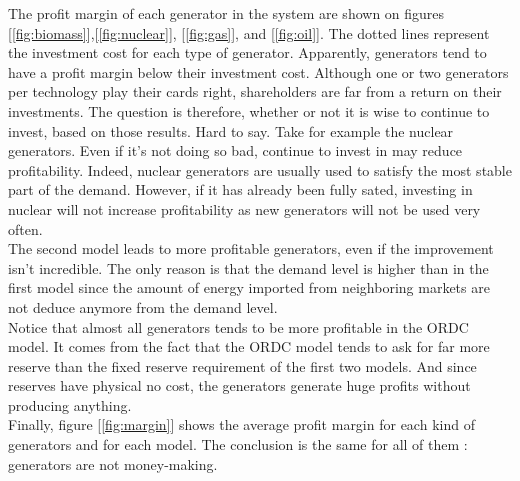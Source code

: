 
The profit margin of each generator in the system are shown on figures [\ref{fig:biomass}],[\ref{fig:nuclear}], [\ref{fig:gas}], and [\ref{fig:oil}]. The dotted lines represent the investment cost for each type of generator. Apparently, generators tend to have a profit margin below their investment cost. Although one or two generators per technology play their cards right, shareholders are far from a return on their investments. The question is therefore, whether or not it is wise to continue to invest, based on those results. Hard to say. Take for example the nuclear generators. Even if it's not doing so bad, continue to invest in may reduce profitability. Indeed, nuclear generators are usually used to satisfy the most stable part of the demand. However, if it has already been fully sated, investing in nuclear will not increase profitability as new generators will not be used very often.\\

The second model leads to more profitable generators, even if the improvement isn't incredible. The only reason is that the demand level is higher than in the first model since the amount of energy imported from neighboring markets are not deduce anymore from the demand level.\\

Notice that almost all generators tends to be more profitable in the ORDC model. It comes from the fact that the ORDC model tends to ask for far more reserve than the fixed reserve requirement of the first two models. And since reserves have physical no cost, the generators generate huge profits without producing anything. \\

Finally, figure [\ref{fig:margin}] shows the average profit margin for each kind of generators and for each model. The conclusion is the same for all of them : generators are not money-making.

